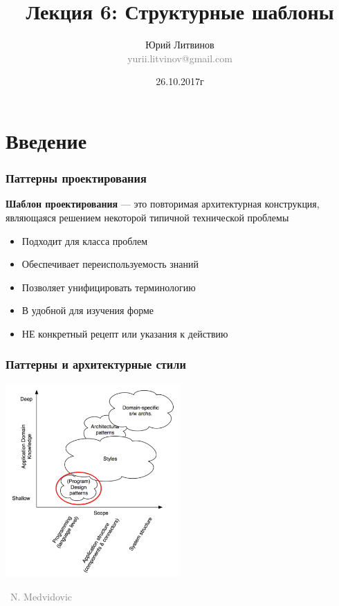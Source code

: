 \documentclass[xetex,mathserif,serif]{beamer}
\title[Структурные шаблоны]{Лекция 6: Структурные шаблоны}
\author[Юрий Литвинов]{Юрий Литвинов\\\small{\textcolor{gray}{yurii.litvinov@gmail.com}}}
\date{26.10.2017г}
\newcommand{\attribution}[1] {
	\vspace{-5mm}\begin{flushright}\begin{scriptsize}\textcolor{gray}{\textcopyright\, #1}\end{scriptsize}\end{flushright}
}
\begin{document}
	\frame{\titlepage}

	\section{Введение}

	\begin{frame}
		\frametitle{Паттерны проектирования}
		\textbf{Шаблон проектирования} --- это повторимая архитектурная конструкция, являющаяся решением некоторой типичной технической проблемы
		\begin{itemize}
			\item Подходит для класса проблем
			\item Обеспечивает переиспользуемость знаний
			\item Позволяет унифицировать терминологию
			\item В удобной для изучения форме
			\item НЕ конкретный рецепт или указания к действию
		\end{itemize}
	\end{frame}

	\begin{frame}
		\frametitle{Паттерны и архитектурные стили}
		\begin{center}
			\includegraphics[width=0.5\textwidth]{architecturalStylesPatternsHighlighted.png}
			\attribution{N. Medvidovic}
		\end{center}
	\end{frame}
\end{document}
